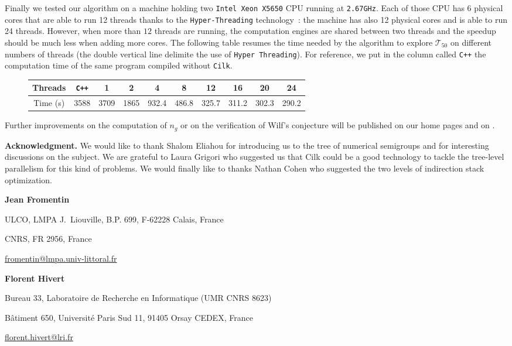 \documentclass[reqno]{amsart}
\theoremstyle{plain}
\theoremstyle{definition}
\newcommand{\Cilk}{\texttt{Cilk}\xspace}
\renewcommand{\tt}[1]{\texttt{#1}}
\begin{document}
Finally we tested our algorithm on a machine holding two 
\tt{Intel\texttrademark{} Xeon\texttrademark{} X5650} CPU running 
at \texttt{2.67GHz}.
Each of those CPU has 6 physical cores that are able to run 12 threads  thanks to the \texttt{Hyper-Threading} 
technology~\cite{WikipediaHT}: the 
machine has also 12 physical cores and  is able to run 24 threads.
However, when more 
than $12$ threads are running, the computation engines are shared between two 
threads and the speedup should be much less when
adding more cores. 
The following table resumes the time needed by the algorithm 
to explore $\mathcal{T}_{50}$ on different numbers of threads (the double 
vertical line delimite the use of \texttt{Hyper Threading}). For reference,
we put in the column called \texttt{C++} the computation time of the same
program compiled without \Cilk.
\begin{figure}[h!]
\begin{tabular}{|c|c|c|c|c|c|c||c|c|c|}
\hline
 Threads & \texttt{C++} & 1 & 2 & 4 & 8 & 12 & 16 & 20 & 24\\
 \hline
 Time (s) & 3588 & 3709 & 1865 & 932.4 & 486.8 & 325.7 & 311.2 & 302.3 & 290.2\\
 \hline
\end{tabular}
\end{figure}

Further improvements on the computation of $n_g$  or on the verification of Wilf's conjecture will be published on our home pages and on \cite{code}.
\vspace{2em}

\textbf{Acknowledgment.} We would like to thank Shalom Eliahou for introducing
us to the tree of numerical semigroups and for interesting discussions on the
subject. We are grateful to Laura Grigori who suggested us that Cilk could be
a good technology to tackle the tree-level parallelism for this kind of
problems.  We would finally like to thanks Nathan Cohen who suggested the two
levels of indirection stack optimization.


 

\newpage

\noindent \textbf{Jean Fromentin}

ULCO, LMPA J.~Liouville, B.P. 699, F-62228 Calais, France

CNRS, FR 2956, France

\url{fromentin@lmpa.univ-littoral.fr}

\vspace{2em}

\noindent \textbf{Florent Hivert}

Bureau 33, Laboratoire de Recherche en Informatique (UMR CNRS 8623)

B\^atiment 650, Universit\'e Paris Sud 11, 91405 Orsay CEDEX, France

\url{florent.hivert@lri.fr}
\end{document}
